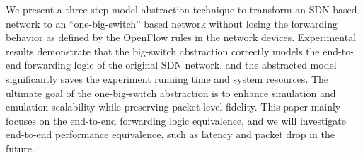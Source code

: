 \label{OBS:Sec:Conclusion}

We present a three-step model abstraction technique to transform an SDN-based network to
an ``one-big-switch'' based network without losing the forwarding behavior as
defined by the OpenFlow rules in the network devices.
Experimental results demonstrate that the big-switch abstraction correctly models
the end-to-end forwarding logic of the original SDN network,
and the abstracted model significantly saves the experiment running time and system resources.
The ultimate goal of the one-big-switch abstraction is to enhance simulation and emulation scalability while preserving packet-level fidelity.
This paper mainly focuses on the end-to-end forwarding logic equivalence,
and we will investigate end-to-end performance equivalence, such as latency and packet drop in the future.


